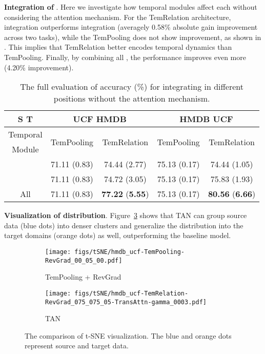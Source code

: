 \documentclass[10pt,twocolumn,letterpaper]{article}
\begin{document}
\noindent\textbf{Integration of }.
Here we investigate how temporal modules affect each  without considering the attention mechanism.
For the TemRelation architecture,  integration outperforms  integration (averagely 0.58\% absolute gain improvement across two tasks), while the TemPooling does not show improvement, as shown in . This implies that TemRelation better encodes temporal dynamics than TemPooling. 
Finally, by combining all , the performance improves even more (4.20\% improvement).

\begin{table}[!t]
\centering
\scriptsize
    \begin{tabular}{c|c|c|c|c}
    S  T & \multicolumn{2}{c|}{UCF  HMDB} & \multicolumn{2}{c}{HMDB  UCF} \\ \hline
    Temporal & \multirow{2}{*}{TemPooling} & \multirow{2}{*}{TemRelation} & \multirow{2}{*}{TemPooling} & \multirow{2}{*}{TemRelation} \\ 
    Module &  &  &  &  \\ \hline
     & 71.11 (0.83) & 74.44 (2.77) & 75.13 (0.17) & 74.44 (1.05) \\
     & 71.11 (0.83) & 74.72 (3.05) & 75.13 (0.17) & 75.83 (1.93)  \\ \hline
    All  & 71.11 (0.83) & \textbf{77.22} (\textbf{5.55}) & 75.13 (0.17) & \textbf{80.56} (\textbf{6.66}) \\ \hline
    \end{tabular}
\caption{The full evaluation of accuracy (\%) for integrating  in different positions without the attention mechanism. 
}
\label{table:experiments_dann_position}
\end{table}

\noindent\textbf{Visualization of distribution}.
Figure~\ref{fig:tSNE} shows that TAN 
can group source data (blue dots) into denser clusters and generalize the distribution into the target domains (orange dots) as well, outperforming the baseline model. 

\begin{figure}[!t]
  \begin{subfigure}[b]{0.235\textwidth}
    \texttt{[image: figs/tSNE/hmdb\_ucf-TemPooling-RevGrad\_00\_05\_00.pdf]}
    \caption{TemPooling + RevGrad~\cite{ganin2015unsupervised}}
    \label{fig:tSNE_TemPooling_G}
  \end{subfigure}
  \begin{subfigure}[b]{0.235\textwidth}
    \texttt{[image: figs/tSNE/hmdb\_ucf-TemRelation-RevGrad\_075\_075\_05-TransAttn-gamma\_0003.pdf]}
    \caption{TAN}
    \label{fig:tSNE_TAAAN}
  \end{subfigure}
\caption{The comparison of t-SNE visualization. The blue and orange dots represent source and target data. 
}
\label{fig:tSNE}
\end{figure}

{\small


}
\end{document}
